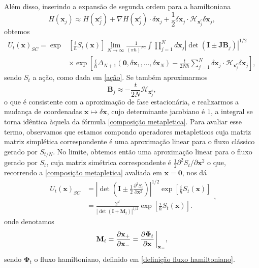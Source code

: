 \documentclass[
	12pt,
	oneside,			%
	a4paper,			%
	english,			%
	brazil				%
	]{abntex2}
\theoremstyle{definition}
\begin{document}
Além disso, inserindo a expansão de segunda ordem para a hamiltoniana
\begin{equation}
    H(\mathbf{x}_j) \approx H\left(\mathbf{x}_j^c\right) + \nabla H \left(\mathbf{x}_j^c\right) \cdot  \delta \mathbf{x}_j + \frac{1}{2} \delta \mathbf{x}_j \cdot \boldsymbol{\mathcal{H}}_{\mathbf{x}^c_j} \delta \mathbf{x}_j,
\end{equation}
obtemos
\begin{equation}
    \begin{aligned}
        U_t \left( \mathbf{x} \right)_{SC} = \exp &\left[ \frac{i}{\hbar} S_t \left(\mathbf{x} \right) \right] \lim_{N \to \infty} \frac{1}{\left( \pi \hbar \right)^{Nd}} \int  \prod_{j=1}^{N} d \mathbf{x}_j \left| \det \left( \mathbf{I} \pm \mathbf{JB}_j \right) \right|^{1/2}  \\ &\times \exp \left[ \frac{i}{\hbar} \Delta_{N+1}\left(\boldsymbol{0},\delta\mathbf{x}_1,\ldots,\delta\mathbf{x}_N\right) - \frac{t}{2N \hbar}\sum_{j=1}^{N} \delta \mathbf{x}_j \cdot \boldsymbol{\mathcal{H}}_{\mathbf{x}^c_j} \delta \mathbf{x}_j \right],
    \end{aligned}
\end{equation}
sendo $S_t$ a ação, como dada em \eqref{ação}. Se também aproximarmos
\begin{equation}
    \mathbf{B}_j \approx - \frac{t}{2N} \boldsymbol{\mathcal{H}}_{\mathbf{x}^c_j},
\end{equation}
o que é consistente com a aproximação de fase estacionária, e realizarmos a mudança de coordenadas $\mathbf{x} \mapsto \delta\mathbf{x}$, cujo determinante jacobiano é $1$, a integral se torna idêntica àquela da fórmula \eqref{composição metapletica}. Para avaliar esse termo, observamos que estamos compondo operadores metapleticos cuja matriz matriz simplética correspondente é uma aproximação linear para o fluxo clássico gerado por $S_{t/N}$. No limite, obtemos então uma aproximação linear para o fluxo gerado por $S_{t}$, cuja matriz simétrica correspondente é $\frac{1}{2} \partial^2 S_t/ \partial \mathbf{x}^2$ o que, recorrendo a \eqref{composição metapletica} avaliada em $\mathbf{x} = \boldsymbol{0}$, nos dá
\begin{equation}
    \label{aproximação semiclássica}
    \begin{aligned}
        U_t\left( \mathbf{x} \right)_{SC} &= \left|\det \left( \mathbf{I} \pm \frac{1}{2} \frac{\partial^2 S_t}{\partial \mathbf{x}^2}\right) \right|^{1/2} \exp \left[ \frac{i}{\hbar} S_t \left(\mathbf{x} \right) \right] \\
         &=  \frac{2^d}{\left|\det \left( \mathbf{I} + \mathbf{M}_t\right) \right|^{1/2}} \exp \left[ \frac{i}{\hbar} S_t \left(\mathbf{x} \right) \right].
    \end{aligned},
\end{equation}
onde denotamos
\begin{equation}
    \mathbf{M}_t = \dfrac{\partial \mathbf{x}_+}{\partial \mathbf{x}_-} = \frac{\partial \boldsymbol{\Phi}_t}{\partial \mathbf{x}} \eval_{\mathbf{x}_-},
\end{equation}
sendo $\boldsymbol{\Phi}_t$ o fluxo hamiltoniano, definido em \eqref{definição fluxo hamiltoniano}.
\end{document}
